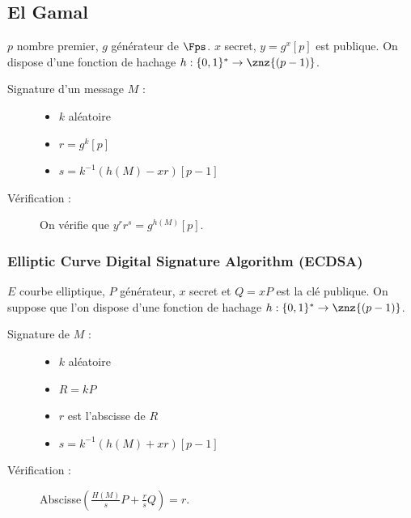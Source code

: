         \subsection{El Gamal}
            $p$ nombre premier, $g$ générateur de $\Fps$. $x$ secret, $y = g^x [p]$ est publique. On dispose d'une fonction de hachage $h : \{0, 1\}^* \to \znz{(p - 1)}$.
            \begin{description}
                \item[Signature d'un message $M$ :] 
                    \begin{itemize}
                        \item $k$ aléatoire
                        \item $r = g^k [p]$
                        \item $s = k^{-1}(h(M) - xr) [p - 1]$
                    \end{itemize}
                \item[Vérification :] On vérifie que $y^rr^s = g^{h(M)} [p]$.
            \end{description}

            \subsubsection{Elliptic Curve Digital Signature Algorithm (ECDSA)}
                $E$ courbe elliptique, $P$ générateur, $x$ secret et $Q = xP$ est la clé publique. On suppose que l'on dispose d'une fonction de hachage $h : \{0, 1\}^* \to \znz{(p - 1)}$.
                \begin{description}
                    \item[Signature de $M$ :] 
                    \begin{itemize}
                        \item $k$ aléatoire
                        \item $R= kP$
                        \item $r$ est l'abscisse de $R$
                        \item $s = k^{-1} (h(M) + xr) [p - 1]$
                    \end{itemize}
                    \item[Vérification :] Abscisse$\left( \frac{H(M)}s P + \frac rs Q \right) = r$.
                \end{description}